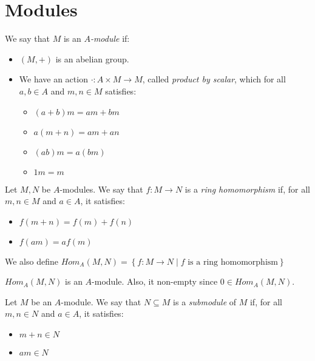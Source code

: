 \section{Modules}\label{sec:modules}

        \begin{defn}
            We say that $M$ is an \emph{$A$-module} if:
            \begin{itemize}
                \item $(M, +)$ is an abelian group.
                \item We have an action $\cdot: A \times M \longrightarrow M$, called \emph{product by scalar}, which for all $a, b \in A$ and $m, n \in M$ satisfies:
                \begin{itemize}
                    \item $(a + b)m = am + bm$
                    \item $a(m + n) = am + an$
                    \item $(ab)m = a (bm)$
                    \item $1 m = m$
                \end{itemize}
            \end{itemize}
        \end{defn}

        \begin{defn}
            Let $M, N$ be $A$-modules.
            We say that $f: M \longrightarrow N$ is a \emph{ring homomorphism} if, for all $m,n \in M$ and $a \in A$, it satisfies:
            \begin{itemize}
                \item $f(m + n) = f(m) + f(n)$
                \item $f(am) = a f(m)$
            \end{itemize}
            We also define $Hom_A(M,N) = \left\{ f: M \longrightarrow N \mid f \text{ is a ring homomorphism}\right\}$
        \end{defn}

        \begin{rk}
            $Hom_A(M,N)$ is an $A$-module.
            Also, it non-empty since $0 \in Hom_A(M,N)$.
        \end{rk}

        \begin{defn}
            Let $M$ be an $A$-module.
            We say that $N \subseteq M$ is a \emph{submodule} of $M$ if, for all $m, n \in N$ and $a \in A$, it satisfies:
            \begin{itemize}
                \item $m + n \in N$
                \item $am \in N$
            \end{itemize}
        \end{defn}


